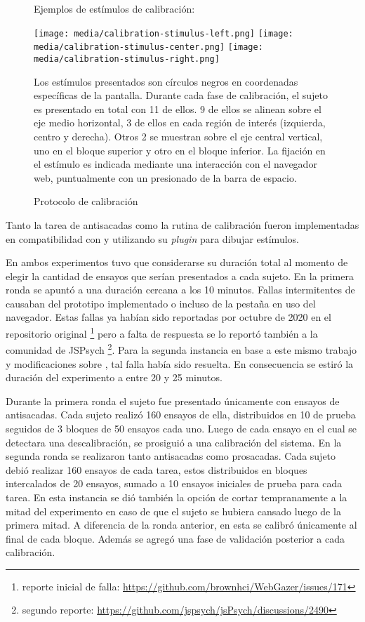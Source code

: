 \begin{figure}
    \centering

    Ejemplos de estímulos de calibración:

    \texttt{[image: media/calibration-stimulus-left.png]}
    \texttt{[image: media/calibration-stimulus-center.png]}
    \texttt{[image: media/calibration-stimulus-right.png]}

    Los estímulos presentados son círculos negros en coordenadas específicas de
    la pantalla.
    Durante cada fase de calibración, el sujeto es presentado en total con 11
    de ellos.
    9 de ellos se alinean sobre el eje medio horizontal, 3 de ellos en cada
    región de interés (izquierda, centro y derecha).
    Otros 2 se muestran sobre el eje central vertical, uno en el bloque
    superior y otro en el bloque inferior.
    La fijación en el estímulo es indicada mediante una interacción con el
    navegador web, puntualmente con un presionado de la barra de espacio.

    \caption{Protocolo de calibración}
    \label{fig:calibration-protocol}
\end{figure}

Tanto la tarea de antisacadas como la rutina de calibración fueron
implementadas en compatibilidad con \jspsych y utilizando su \textit{plugin}
\psychophysics para dibujar estímulos.

En ambos experimentos tuvo que considerarse su duración total al momento de 
elegir la cantidad de ensayos que serían presentados a cada sujeto.
En la primera ronda se apuntó a una duración cercana a los 10 minutos.
Fallas intermitentes de \webgazer causaban \crashes del prototipo implementado
o incluso de la pestaña en uso del navegador.
Estas fallas ya habían sido reportadas por octubre de 2020 en el repositorio
original \footnote{reporte inicial de falla:
\url{https://github.com/brownhci/WebGazer/issues/171}} pero a falta de
respuesta se lo reportó también a la comunidad de JSPsych \footnote{segundo
reporte: \url{https://github.com/jspsych/jsPsych/discussions/2490}}.
Para la segunda instancia en base a este mismo trabajo y modificaciones sobre
\webgazer, tal falla había sido resuelta.
En consecuencia se estiró la duración del experimento a entre 20 y 25 minutos.

Durante la primera ronda el sujeto fue presentado únicamente con ensayos de
antisacadas.
Cada sujeto realizó 160 ensayos de ella, distribuidos en 10 de prueba seguidos
de 3 bloques de 50 ensayos cada uno.
Luego de cada ensayo en el cual se detectara una descalibración, se prosiguió
a una calibración del sistema.
En la segunda ronda se realizaron tanto antisacadas como prosacadas.
Cada sujeto debió realizar 160 ensayos de cada tarea, estos distribuidos en
bloques intercalados de 20 ensayos, sumado a 10 ensayos iniciales de prueba
para cada tarea.
En esta instancia se dió también la opción de cortar tempranamente a la mitad
del experimento en caso de que el sujeto se hubiera cansado luego de la primera
mitad.
A diferencia de la ronda anterior, en esta se calibró únicamente al final de
cada bloque.
Además se agregó una fase de validación posterior a cada calibración.

